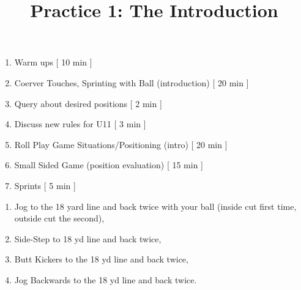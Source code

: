 \documentclass[10pt,letterpaper]{article}
\title{Practice 1: The Introduction}
\author{}
\date{}
\newenvironment{agendablock}[1]{%
    \tcolorbox[beamer,%
    noparskip,breakable,
    colback=LightGray,colframe=DarkGray,%
    colbacklower=Gray!75!LightGray,%
    title=#1]}%
    {\endtcolorbox}
\newenvironment{myalertblock}[1]{%
    \tcolorbox[beamer,%
    noparskip,breakable,
    colback=LightCoral,colframe=DarkRed,%
    colbacklower=Tomato!75!LightCoral,%
    title=#1]}%
    {\endtcolorbox}
\begin{document}
\selectfont
\maketitle

\begin{agendablock}{Practice Activities}
    \begin{enumerate}
        \item Warm ups [ 10 min ]
        \item Coerver Touches, Sprinting with Ball (introduction) [ 20 min ]
        \item Query about desired positions [ 2 min ]
        \item Discuss new rules for U11 [ 3 min ]
        \item Roll Play Game Situations/Positioning (intro) [ 20 min ]
        \item Small Sided Game (position evaluation) [ 15 min ]
        \item Sprints [ 5 min ] 
    \end{enumerate}

\end{agendablock}

\begin{myalertblock}{Warm Ups (10 min) }
    \begin{enumerate}
        \item Jog to the 18 yard line and back twice with your ball (inside cut first time, outside cut the second),
        \item Side-Step to 18 yd line and back twice,
        \item Butt Kickers to the 18 yd line and back twice,
        \item Jog Backwards to the 18 yd line and back twice.
    \end{enumerate}
\end{myalertblock}
\end{document}
